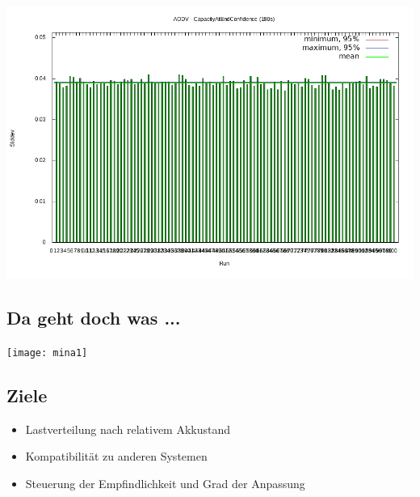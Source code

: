 \documentclass[11pt,handout,notes=only]{beamer}
\begin{document}
\begin{frame}{\insertsubsection}
  \begin{center}
\includegraphics[scale=0.45]{aodv-100}
  \end{center}
\end{frame}


\subsection{Da geht doch was ...}

\begin{frame}{\insertsubsection}
  \begin{center}
\texttt{[image: mina1]}
  \end{center}
\end{frame}

\subsection{Ziele}

\begin{frame}{\insertsubsection}
\begin{itemize}
\item Lastverteilung nach relativem Akkustand\newline
\item Kompatibilität zu anderen Systemen\newline
\item Steuerung der Empfindlichkeit und Grad der Anpassung\newline
\end{itemize}
\end{frame}
\end{document}
